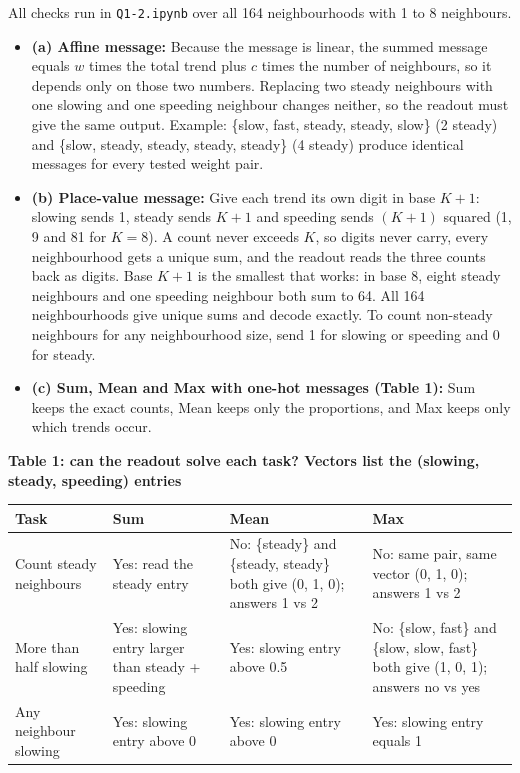 
All checks run in \texttt{Q1-2.ipynb} over all 164 neighbourhoods with 1 to 8 neighbours.
\begin{itemize}
    \item \textbf{(a) Affine message:} Because the message is linear, the summed message equals $w$ times the total trend plus $c$ times the number of neighbours, so it depends only on those two numbers. Replacing two steady neighbours with one slowing and one speeding neighbour changes neither, so the readout must give the same output. Example: \{slow, fast, steady, steady, slow\} (2 steady) and \{slow, steady, steady, steady, steady\} (4 steady) produce identical messages for every tested weight pair.
    \item \textbf{(b) Place-value message:} Give each trend its own digit in base $K+1$: slowing sends 1, steady sends $K+1$ and speeding sends $(K+1)$ squared (1, 9 and 81 for $K = 8$). A count never exceeds $K$, so digits never carry, every neighbourhood gets a unique sum, and the readout reads the three counts back as digits. Base $K+1$ is the smallest that works: in base 8, eight steady neighbours and one speeding neighbour both sum to 64. All 164 neighbourhoods give unique sums and decode exactly. To count non-steady neighbours for any neighbourhood size, send 1 for slowing or speeding and 0 for steady.
    \item \textbf{(c) Sum, Mean and Max with one-hot messages (Table 1):} Sum keeps the exact counts, Mean keeps only the proportions, and Max keeps only which trends occur.
\end{itemize}

\vspace{4pt}\noindent\begin{minipage}{\textwidth}
\centering\footnotesize
\textbf{Table 1: can the readout solve each task? Vectors list the (slowing, steady, speeding) entries}\\[2pt]
\begin{tabular}{@{}l>{\raggedright\arraybackslash}p{}>{\raggedright\arraybackslash}p{}>{\raggedright\arraybackslash}p{}@{}}
\toprule
Task & Sum & Mean & Max \\
\midrule
Count steady neighbours & Yes: read the steady entry & No: \{steady\} and \{steady, steady\} both give (0, 1, 0); answers 1 vs 2 & No: same pair, same vector (0, 1, 0); answers 1 vs 2 \\
More than half slowing & Yes: slowing entry larger than steady + speeding & Yes: slowing entry above 0.5 & No: \{slow, fast\} and \{slow, slow, fast\} both give (1, 0, 1); answers no vs yes \\
Any neighbour slowing & Yes: slowing entry above 0 & Yes: slowing entry above 0 & Yes: slowing entry equals 1 \\
\bottomrule
\end{tabular}
\end{minipage}
\vspace{4pt}
